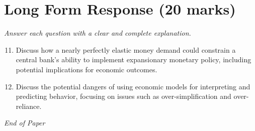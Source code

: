 \documentclass[12pt]{article}
\begin{document}
\section*{Long Form Response (20 marks)}
\textit{Answer each question with a clear and complete explanation.}
\begin{enumerate}[label=\arabic*.]
\setcounter{enumi}{10}
\item Discuss how a nearly perfectly elastic money demand could constrain a central bank's ability to implement expansionary monetary policy, including potential implications for economic outcomes.
\item Discuss the potential dangers of using economic models for interpreting and predicting behavior, focusing on issues such as over-simplification and over-reliance.
\end{enumerate}

\vfill
\noindent\textit{End of Paper}
\end{document}
